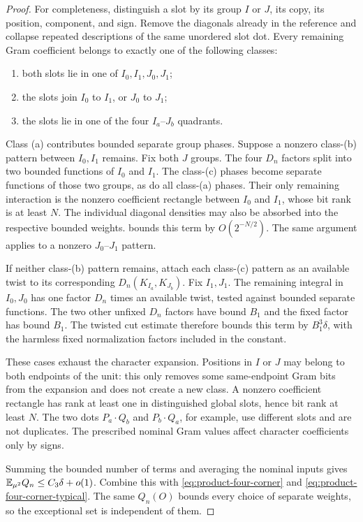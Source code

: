 \begin{proof}
For completeness, distinguish a slot by its group $I$ or $J$, its
copy, its position, component, and sign. Remove the diagonals already
in the reference and collapse repeated descriptions of the same
unordered slot dot. Every remaining Gram coefficient belongs to
exactly one of the following classes:
\begin{enumerate}[label=(\alph*)]
\item both slots lie in one of $I_0,I_1,J_0,J_1$;
\item the slots join $I_0$ to $I_1$, or $J_0$ to $J_1$;
\item the slots lie in one of the four $I_a$--$J_b$ quadrants.
\end{enumerate}
Class (a) contributes bounded separate group phases. Suppose a
nonzero class-(b) pattern between $I_0,I_1$ remains. Fix both $J$
groups. The four $D_n$ factors split into two bounded functions of
$I_0$ and $I_1$. The class-(c) phases become separate functions of
those two groups, as do all class-(a) phases. Their only remaining
interaction is the nonzero coefficient rectangle between $I_0$ and
$I_1$, whose bit rank is at least $N$. The individual diagonal
densities may also be absorbed into the respective bounded weights.
 bounds this term by $O(2^{-N/2})$. The same argument
applies to a nonzero $J_0$--$J_1$ pattern.

If neither class-(b) pattern remains, attach each class-(c) pattern
as an available twist to its corresponding $D_n(K_{I_a},K_{J_b})$.
Fix $I_1,J_1$. The remaining integral in $I_0,J_0$ has one factor
$D_n$ times an available twist, tested against bounded separate
functions. The two other unfixed $D_n$ factors have bound $B_1$ and
the fixed factor has bound $B_1$. The twisted cut estimate therefore
bounds this term by $B_1^3\delta$, with the harmless fixed
normalization factors included in the constant.

These cases exhaust the character expansion. Positions in $I$ or
$J$ may belong to both endpoints of the unit: this only removes some
same-endpoint Gram bits from the expansion and does not create a new
class. A nonzero coefficient rectangle has rank at least one in
distinguished global slots, hence bit rank at least $N$.
The two dots $P_a\cdot Q_b$ and $P_b\cdot Q_a$, for example, use
different slots and are not duplicates. The prescribed nominal Gram
values affect character coefficients only by signs.

Summing the bounded number of terms and averaging the nominal inputs
gives $\mathbb E_{\mu^2}Q_n\le C_3\delta+o(1)$. Combine this with
\eqref{eq:product-four-corner} and
\eqref{eq:product-four-corner-typical}. The same $Q_n(O)$ bounds every
choice of separate weights, so the exceptional set is independent of
them.
\end{proof}

